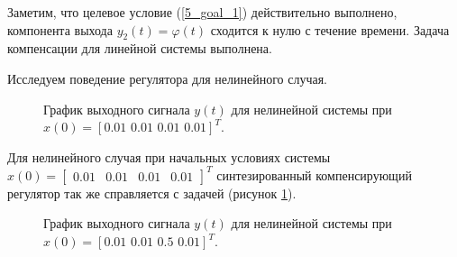 Заметим, что целевое условие (\ref{5_goal_1}) действительно выполнено, компонента выхода $y_2(t) = \varphi(t)$ сходится к нулю с течение времени. Задача компенсации для линейной системы выполнена.

Исследуем поведение регулятора для нелинейного случая.

\begin{figure}[!h]
\caption{График выходного сигнала $y(t)$ для нелинейной системы при $x(0) = 
    [0.01 \,\, 0.01 \,\, 0.01 \,\, 0.01]^T$.}
\label{5_f_nonlin}
\end{figure}

Для нелинейного случая при начальных условиях системы $x(0) = \begin{bmatrix}
    0.01 & 0.01 & 0.01 & 0.01
\end{bmatrix}^T$ синтезированный компенсирующий регулятор так же справляется с задачей (рисунок \ref{5_f_nonlin}).

\begin{figure}[!h]
\caption{График выходного сигнала $y(t)$ для нелинейной системы при $x(0) = 
    [0.01 \,\, 0.01 \,\, 0.5 \,\, 0.01]^T$.}
\label{5_f_nonlin_1}
\end{figure}

